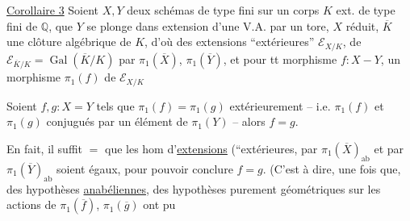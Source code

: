 \uline{Corollaire 3} Soient  $X,Y$ deux schémas de type fini sur un corps $K$ ext. de type fini de $\mathbb Q$,   que $Y$ se plonge dans   extension d'une V.A. par un tore, $X$ réduit,   $\overline K$ une clôture algébrique de $K$, d'où des extensions ``extérieures'' $\mathcal E_{X/K}$,  de $\mathcal E_{\overline K/K}=\operatorname{Gal}(\overline K/K)$ par $\pi_1(\overline X)$, $\pi_1(\overline Y)$, et pour tt morphisme $f:X-Y$, un morphisme $\pi_1(f)$ de $\mathcal E_{X/K}$ 

Soient $f,g:X=Y$ tels que $\pi_1(f)=\pi_1(g)$ extérieurement -- i.e. $\pi_1(f)$ et $\pi_1(g)$  conjugués par un élément de $\pi_1(Y)$ -- alors $f=g$.

En fait, il suffit $=$ que les hom d'\uline{extensions} (``extérieures,  par $\pi_1(\overline X)_{\mathrm{ab}}$ et par $\pi_1(\overline Y)_{\mathrm{ab}}$ soient égaux, pour pouvoir conclure $f=g$. (C'est à dire, une fois que,   des hypothèses \uline{anabéliennes}, des hypothèses purement géométriques sur les actions de $\pi_1(\overline f)$, $\pi_1(\overline g)$ ont pu 
